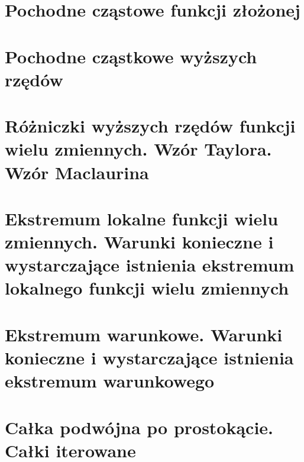 \documentclass[10pt]{article}
\begin{document}
\section{Pochodne cząstowe funkcji złożonej}

\section{Pochodne cząstkowe wyższych rzędów}

\section{Różniczki wyższych rzędów funkcji wielu zmiennych. Wzór Taylora. Wzór Maclaurina}

\section{Ekstremum lokalne funkcji wielu zmiennych. Warunki konieczne i wystarczające istnienia ekstremum lokalnego funkcji wielu zmiennych}

\section{Ekstremum warunkowe. Warunki konieczne i wystarczające istnienia ekstremum warunkowego}

\section{Całka podwójna po prostokącie. Całki iterowane}
\end{document}
